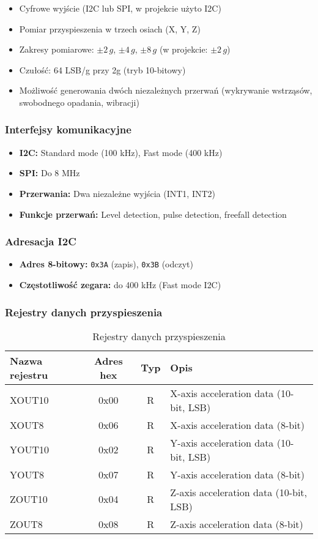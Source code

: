 \documentclass[a4paper,12pt]{report}
\begin{document}
\begin{itemize}
    \item Cyfrowe wyjście (I2C lub SPI, w projekcie użyto I2C)
    \item Pomiar przyspieszenia w trzech osiach (X, Y, Z)
    \item Zakresy pomiarowe: \(\pm2\,g\), \(\pm4\,g\), \(\pm8\,g\) (w projekcie: \(\pm2\,g\))
    \item Czułość: 64 LSB/g przy 2g (tryb 10-bitowy)
    \item Możliwość generowania dwóch niezależnych przerwań (wykrywanie wstrząsów, swobodnego opadania, wibracji)
\end{itemize}

\subsubsection{Interfejsy komunikacyjne}
\begin{itemize}
    \item \textbf{I2C:} Standard mode (100 kHz), Fast mode (400 kHz)
    \item \textbf{SPI:} Do 8 MHz
    \item \textbf{Przerwania:} Dwa niezależne wyjścia (INT1, INT2)
    \item \textbf{Funkcje przerwań:} Level detection, pulse detection, freefall detection
\end{itemize}

\subsubsection{Adresacja I2C}
\begin{itemize}
    \item \textbf{Adres 8-bitowy:} \texttt{0x3A} (zapis), \texttt{0x3B} (odczyt)
    \item \textbf{Częstotliwość zegara:} do 400 kHz (Fast mode I2C)
\end{itemize}

\subsubsection{Rejestry danych przyspieszenia}

\begin{table}[H]
\centering
\begin{tabular}{|l|c|c|l|}
\hline
\textbf{Nazwa rejestru} & \textbf{Adres hex} & \textbf{Typ} & \textbf{Opis} \\
\hline
XOUT10 & 0x00 & R & X-axis acceleration data (10-bit, LSB) \\
XOUT8 & 0x06 & R & X-axis acceleration data (8-bit) \\
YOUT10 & 0x02 & R & Y-axis acceleration data (10-bit, LSB) \\
YOUT8 & 0x07 & R & Y-axis acceleration data (8-bit) \\
ZOUT10 & 0x04 & R & Z-axis acceleration data (10-bit, LSB) \\
ZOUT8 & 0x08 & R & Z-axis acceleration data (8-bit) \\
\hline
\end{tabular}
\caption{Rejestry danych przyspieszenia}
\end{table}
\end{document}
